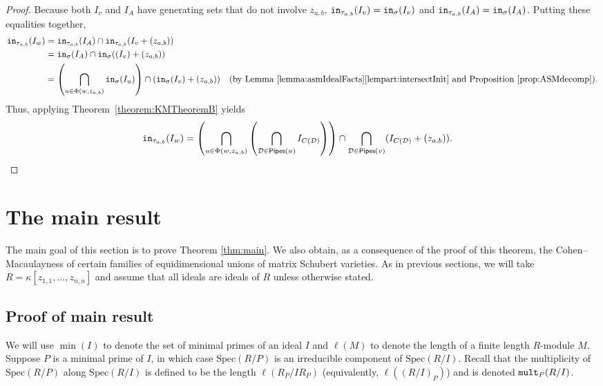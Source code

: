 \documentclass[12pt,reqno]{amsart}
\newtheorem{Main Conjecture}[theorem]{Main Conjecture}
\theoremstyle{remark}
\theoremstyle{plain}
\newcommand{\init}{{\tt in}}
\newcommand{\mult}{{\tt mult}}
\newcommand{\pipes}{{\sf Pipes}}
\newcommand{\spec}{{\mbox{Spec}}}
\begin{document}
\begin{proof}
Because both $I_v$ and $I_A$ have generating sets that do not involve $z_{a,b}$, $\init_{\tau_{a,b}}(I_v) = \init_\sigma(I_v)$ and $\init_{\tau_{a,b}}(I_A) = \init_\sigma(I_A)$.  Putting these equalities together,
\begin{align*}
    \init_{\tau_{a,b}}(I_w)&=\init_{\tau_{a,b}}(I_A) \cap \init_{\tau_{a,b}}(I_v+(z_{a,b})) \\
    &=\init_\sigma(I_A) \cap \init_\sigma((I_v)+(z_{a,b})) \\
    &=\left(\bigcap_{u\in \Phi(w,z_{a,b})} \init_\sigma(I_u) \right) \cap (\init_\sigma(I_v)+(z_{a,b})) & \text{(by Lemma~\ref{lemma:asmIdealFacts}\ref{lempart:intersectInit} and Proposition~\ref{prop:ASMdecomp}).}
    \end{align*}
    Thus, applying Theorem~\ref{theorem:KMTheoremB} yields
    \begin{align*}
       \init_{ \tau_{a,b}}(I_w)=\left (  \bigcap_{u\in \Phi(w,z_{a,b})}\left(\bigcap_{\mathcal D \in \pipes(u)} I_{C(\mathcal D)} \right)\right )\cap \bigcap_{\mathcal D\in \pipes(v)} ( I_{C(\mathcal D)}+(z_{a,b})) .&\qedhere 
    \end{align*}
\end{proof}



\section{The main result}
\label{section:proofs}

The main goal of this section is to prove Theorem \ref{thm:main}.  We also obtain, as a consequence of the proof of this theorem, the Cohen--Macaulayness of certain families of  equidimensional unions of matrix Schubert varieties.  As in previous sections, we will take $R = \kappa[z_{1,1}, \ldots, z_{n,n}]$ and assume that all ideals are ideals of $R$ unless otherwise stated.  

\subsection{Proof of main result}
\label{subsect:mainProofs}

We will use $\min(I)$ to denote the set of minimal primes of an ideal $I$ and $\ell(M)$ to denote the length of a finite length $R$-module $M$.  Suppose $P$ is a minimal prime of $I$, in which case $\spec(R/P)$ is an irreducible component of $\spec(R/I)$.  Recall that the multiplicity of $\spec(R/P)$ along $\spec(R/I)$ is defined to be the length $\ell(R_P/IR_P)$ (equivalently, $\ell((R/I)_P)$) and is denoted $\mult_P(R/I)$.
\end{document}
